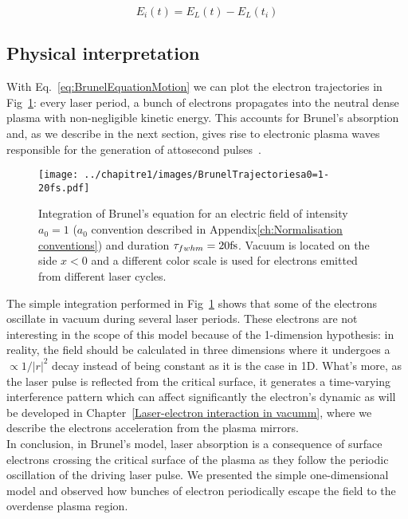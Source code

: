 \begin{equation}
E_i(t) = E_L(t) - E_L(t_i)
\end{equation}

\subsection{Physical interpretation}

With Eq.~\ref{eq:BrunelEquationMotion} we can plot the electron trajectories in Fig~\ref{fig:BrunelTrajectories}: every laser period, a bunch of electrons propagates into the neutral dense plasma with non-negligible kinetic energy. This accounts for Brunel's absorption and, as we describe in the next section, gives rise to electronic plasma waves responsible for the generation of attosecond pulses~\cite{thaury2010high}.

\begin{figure}[H]
\centering
\texttt{[image: ../chapitre1/images/BrunelTrajectoriesa0=1-20fs.pdf]}\\
\caption{\label{fig:BrunelTrajectories}Integration of Brunel's equation for an electric field of intensity $a_0=1$ ($a_0$ convention described in Appendix\ref{ch:Normalisation conventions}) and duration $\tau_{fwhm} = 20 \rm{fs}$. Vacuum is located on the side $x<0$ and a different color scale is used for electrons emitted from different laser cycles.}
\end{figure}

\noindent The simple integration performed in Fig~\ref{fig:BrunelTrajectories} shows that some of the electrons oscillate in vacuum during several laser periods. These electrons are not interesting in the scope of this model because of the 1-dimension hypothesis: in reality, the field should be calculated in three dimensions 
where it undergoes a $\propto 1/|r|^2$ decay instead of being constant as it is the case in 1D. What's more, as the laser pulse is reflected from the critical surface, it generates a time-varying interference pattern which can affect significantly the electron's dynamic as will be developed in Chapter~\ref{Laser-electron interaction in vacumm}, where we describe the electrons acceleration from the plasma mirrors.\\

\noindent In conclusion, in Brunel's model, laser absorption is a consequence of surface electrons crossing the critical surface of the plasma as they follow the periodic oscillation of the driving laser pulse. We presented the simple one-dimensional model and observed how bunches of electron periodically escape the field to the overdense plasma region. \\

